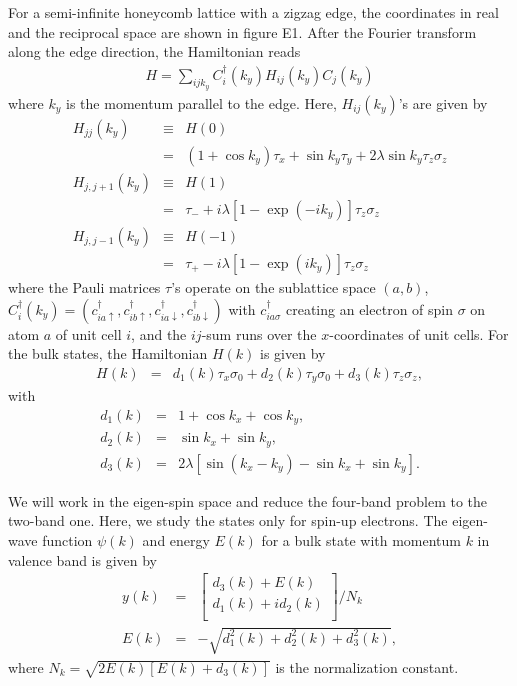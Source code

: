 \documentclass[aps,pra,amsmath,twocolumn,showpacs,bibnotes,10pt]{revtex4-1}
\begin{document}
For a semi-infinite honeycomb lattice with a zigzag edge, the coordinates in real and the reciprocal space are shown in figure E1. After the Fourier transform along the edge direction, the Hamiltonian reads
\begin{eqnarray}
H = \sum_{ij k_y}C^{\dagger}_i(k_y)H_{ij}(k_y)C_j(k_y) \label{thm}
\end{eqnarray}
where $k_y$ is the momentum parallel to the edge. Here, $H_{ij}(k_y)$'s are given by 
\begin{eqnarray}
H_{jj}(k_y) &\equiv& H(0) \nonumber\\
&=&(1+\cos k_y)\tau_x +\sin k_y \tau_y +2\lambda\sin k_y \tau_z\sigma_z \nonumber\\
H_{j,j+1}(k_y) &\equiv& H(1) \nonumber\\
&=&\tau_-  +i\lambda[1-\exp(-ik_y)] \tau_z\sigma_z \nonumber\\
H_{j,j-1}(k_y) &\equiv& H(-1)\nonumber\\
&=&\tau_+  -i\lambda[1-\exp(ik_y)] \tau_z\sigma_z \nonumber 
\end{eqnarray}
where the Pauli matrices $\tau$'s operate on the sublattice space $(a,b)$, $C^{\dagger}_i(k_y) = (c^{\dagger}_{ia\uparrow},c^{\dagger}_{ib\uparrow},c^{\dagger}_{ia\downarrow},c^{\dagger}_{ib\downarrow})$ with $c^{\dagger}_{ia\sigma}$ creating an electron of spin $\sigma$ on atom $a$ of unit cell $i$, and the $ij$-sum runs over the $x$-coordinates of unit cells. For the bulk states, the Hamiltonian $H(k)$ is given by
\begin{eqnarray}
H(k) &=& d_1(k)\tau_x\sigma_0 +d_2(k)\tau_y\sigma_0 +d_3(k)\tau_z\sigma_z, \nonumber 
\end{eqnarray}
with
\begin{eqnarray}
d_1(k) &=& 1+\cos k_x+\cos k_y,     \nonumber\\
d_2(k) &=& \sin k_x+\sin k_y,      \nonumber\\
d_3(k) &=& 2\lambda[\sin (k_x-k_y)-\sin k_x+\sin k_y]. \label{ghm}
\end{eqnarray}

We will work in the eigen-spin space and reduce the four-band problem to the two-band one. Here, we study the states only for spin-up electrons. The eigen-wave function $\psi(k)$ and energy $E(k)$ for a bulk state with momentum $k$ in valence band is given by
\begin{eqnarray}
y(k) &=& \begin{bmatrix}
	d_3(k)+E(k)\\
	d_1(k)+id_2(k)\\
\end{bmatrix}/N_k  \label{gwv1} \\
 E(k) &=& -\sqrt{d^2_1(k)+d^2_2(k)+d^2_3(k)}, \label{eng1}
\end{eqnarray}
where $N_k = \sqrt{2E(k)[E(k)+d_3(k)]}$ is the normalization constant.
\end{document}
